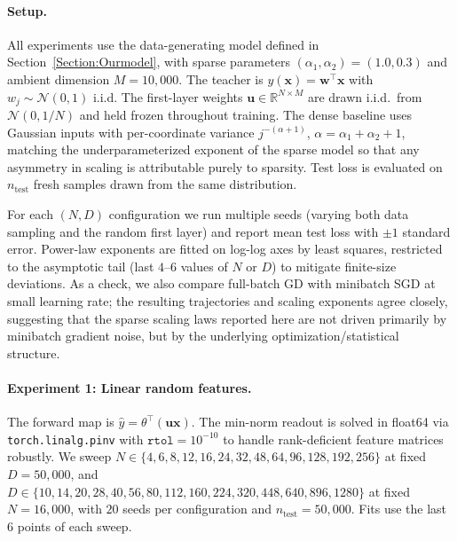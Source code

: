 \documentclass[11pt]{article}
\theoremstyle{plain}
\theoremstyle{definition}
\theoremstyle{remark}
\begin{document}
\paragraph{Setup.} All experiments use the data-generating model defined in Section~\ref{Section:Ourmodel}, with sparse parameters $(\alpha_1, \alpha_2) = (1.0, 0.3)$ and ambient dimension $M = 10{,}000$. The teacher is $y(\mathbf{x}) = \mathbf{w}^\top \mathbf{x}$ with $w_j \sim \mathcal{N}(0, 1)$ i.i.d. The first-layer weights $\mathbf{u} \in \mathbb{R}^{N \times M}$ are drawn i.i.d.\ from $\mathcal{N}(0, 1/N)$ and held frozen throughout training. The dense baseline uses Gaussian inputs with per-coordinate variance $j^{-(\alpha+1)}$, $\alpha = \alpha_1 + \alpha_2 + 1$, matching the underparameterized exponent of the sparse model so that any asymmetry in scaling is attributable purely to sparsity. Test loss is evaluated on $n_{\mathrm{test}}$ fresh samples drawn from the same distribution.


For each $(N, D)$ configuration we run multiple seeds (varying both data sampling and the random first layer) and report mean test loss with $\pm 1$ standard error. Power-law exponents are fitted on log-log axes by least squares, restricted to the asymptotic tail (last $4$--$6$ values of $N$ or $D$) to mitigate finite-size deviations. As a check, we also compare full-batch GD with minibatch SGD at small learning rate; the resulting trajectories and scaling exponents agree closely, suggesting that the sparse scaling laws reported here are not driven primarily by minibatch gradient noise, but by the underlying optimization/statistical structure.


\paragraph{Experiment 1: Linear random features.} The forward map is $\hat y = \theta^\top (\mathbf{u}\mathbf{x})$. The min-norm readout is solved in float64 via \texttt{torch.linalg.pinv} with $\texttt{rtol} = 10^{-10}$ to handle rank-deficient feature matrices robustly. We sweep $N \in \{4,\allowbreak 6,\allowbreak 8,\allowbreak 12,\allowbreak 16,\allowbreak 24,\allowbreak 32,\allowbreak 48,\allowbreak 64,\allowbreak 96,\allowbreak 128,\allowbreak 192,\allowbreak 256\}$ at fixed $D = 50{,}000$, and $D \in \{10,\allowbreak 14,\allowbreak 20,\allowbreak 28,\allowbreak 40,\allowbreak 56,\allowbreak 80,\allowbreak 112,\allowbreak 160,\allowbreak 224,\allowbreak 320,\allowbreak 448,\allowbreak 640,\allowbreak 896,\allowbreak 1280\}$ at fixed $N = 16{,}000$, with $20$ seeds per configuration and $n_{\mathrm{test}} = 50{,}000$. Fits use the last $6$ points of each sweep.
\end{document}
